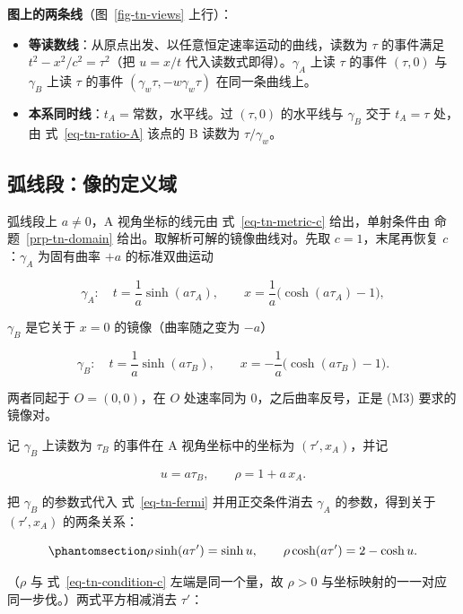 \documentclass[
  chinese,
  a4paper,
  UTF8,
  12pt,
  oneside,
  openany]{ctexbook}
\providecommand{\tightlist}{%
  \setlength{\itemsep}{0pt}\setlength{\parskip}{0pt}}
\theoremstyle{plain}
\theoremstyle{plain}
\theoremstyle{plain}
\theoremstyle{definition}
\theoremstyle{plain}
\theoremstyle{plain}
\theoremstyle{remark}
\begin{document}
\textbf{图上的两条线}（图~\ref{fig-tn-views} 上行）：

\begin{itemize}
\tightlist
\item
  \textbf{等读数线}：从原点出发、以任意恒定速率运动的曲线，读数为
  \(\tau\) 的事件满足 \(t^{2}-x^{2}/c^{2}=\tau^{2}\)（把 \(u=x/t\)
  代入读数式即得）。\(\gamma_A\) 上读 \(\tau\) 的事件 \((\tau,0)\) 与
  \(\gamma_B\) 上读 \(\tau\) 的事件 \((\gamma_w\tau,-w\gamma_w\tau)\)
  在同一条曲线上。
\item
  \textbf{本系同时线}：\(t_A=\text{常数}\)，水平线。过 \((\tau,0)\)
  的水平线与 \(\gamma_B\) 交于 \(t_A=\tau\) 处，由
  式~\ref{eq-tn-ratio-A} 该点的 B 读数为 \(\tau/\gamma_w\)。
\end{itemize}

\subsection{弧线段：像的定义域}\label{ux5f27ux7ebfux6bb5ux50cfux7684ux5b9aux4e49ux57df}

弧线段上 \(a\neq0\)，A 视角坐标的线元由 式~\ref{eq-tn-metric-c}
给出，单射条件由 命题~\ref{prp-tn-domain}
给出。取解析可解的镜像曲线对。先取 \(c=1\)，末尾再恢复
\(c\)：\(\gamma_A\) 为固有曲率 \(+a\) 的标准双曲运动

\[
\gamma_A:\quad t=\frac{1}{a}\sinh(a\tau_A),\qquad x=\frac{1}{a}\bigl(\cosh(a\tau_A)-1\bigr),
\]

\(\gamma_B\) 是它关于 \(x=0\) 的镜像（曲率随之变为 \(-a\)）

\[
\gamma_B:\quad t=\frac{1}{a}\sinh(a\tau_B),\qquad x=-\frac{1}{a}\bigl(\cosh(a\tau_B)-1\bigr).
\]

两者同起于 \(O=(0,0)\)，在 \(O\) 处速率同为 \(0\)，之后曲率反号，正是
(M3) 要求的镜像对。

记 \(\gamma_B\) 上读数为 \(\tau_B\) 的事件在 A 视角坐标中的坐标为
\((\tau',x_A)\)，并记

\[
u=a\tau_B,\qquad \rho=1+a\,x_A .
\]

把 \(\gamma_B\) 的参数式代入 式~\ref{eq-tn-fermi} 并用正交条件消去
\(\gamma_A\) 的参数，得到关于 \((\tau',x_A)\) 的两条关系：

\begin{equation}\protect\phantomsection\label{eq-tn-image-arc}{
\rho\sinh(a\tau')=\sinh u,\qquad \rho\cosh(a\tau')=2-\cosh u .
}\end{equation}

（\(\rho\) 与 式~\ref{eq-tn-condition-c} 左端是同一个量，故 \(\rho>0\)
与坐标映射的一一对应同一步伐。）两式平方相减消去 \(\tau'\)：
\end{document}

